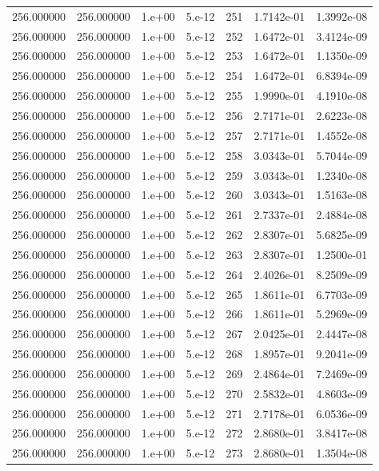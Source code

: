 \begin{table}[htbp]
\begin{tabular}{rrrrrrr}
256.000000 & 256.000000 & 1.e+00 & 5.e-12 & 251 & 1.7142e-01 & 1.3992e-08 \\
256.000000 & 256.000000 & 1.e+00 & 5.e-12 & 252 & 1.6472e-01 & 3.4124e-09 \\
256.000000 & 256.000000 & 1.e+00 & 5.e-12 & 253 & 1.6472e-01 & 1.1350e-09 \\
256.000000 & 256.000000 & 1.e+00 & 5.e-12 & 254 & 1.6472e-01 & 6.8394e-09 \\
256.000000 & 256.000000 & 1.e+00 & 5.e-12 & 255 & 1.9990e-01 & 4.1910e-08 \\
256.000000 & 256.000000 & 1.e+00 & 5.e-12 & 256 & 2.7171e-01 & 2.6223e-08 \\
256.000000 & 256.000000 & 1.e+00 & 5.e-12 & 257 & 2.7171e-01 & 1.4552e-08 \\
256.000000 & 256.000000 & 1.e+00 & 5.e-12 & 258 & 3.0343e-01 & 5.7044e-09 \\
256.000000 & 256.000000 & 1.e+00 & 5.e-12 & 259 & 3.0343e-01 & 1.2340e-08 \\
256.000000 & 256.000000 & 1.e+00 & 5.e-12 & 260 & 3.0343e-01 & 1.5163e-08 \\
256.000000 & 256.000000 & 1.e+00 & 5.e-12 & 261 & 2.7337e-01 & 2.4884e-08 \\
256.000000 & 256.000000 & 1.e+00 & 5.e-12 & 262 & 2.8307e-01 & 5.6825e-09 \\
256.000000 & 256.000000 & 1.e+00 & 5.e-12 & 263 & 2.8307e-01 & 1.2500e-01 \\
256.000000 & 256.000000 & 1.e+00 & 5.e-12 & 264 & 2.4026e-01 & 8.2509e-09 \\
256.000000 & 256.000000 & 1.e+00 & 5.e-12 & 265 & 1.8611e-01 & 6.7703e-09 \\
256.000000 & 256.000000 & 1.e+00 & 5.e-12 & 266 & 1.8611e-01 & 5.2969e-09 \\
256.000000 & 256.000000 & 1.e+00 & 5.e-12 & 267 & 2.0425e-01 & 2.4447e-08 \\
256.000000 & 256.000000 & 1.e+00 & 5.e-12 & 268 & 1.8957e-01 & 9.2041e-09 \\
256.000000 & 256.000000 & 1.e+00 & 5.e-12 & 269 & 2.4864e-01 & 7.2469e-09 \\
256.000000 & 256.000000 & 1.e+00 & 5.e-12 & 270 & 2.5832e-01 & 4.8603e-09 \\
256.000000 & 256.000000 & 1.e+00 & 5.e-12 & 271 & 2.7178e-01 & 6.0536e-09 \\
256.000000 & 256.000000 & 1.e+00 & 5.e-12 & 272 & 2.8680e-01 & 3.8417e-08 \\
256.000000 & 256.000000 & 1.e+00 & 5.e-12 & 273 & 2.8680e-01 & 1.3504e-08 \\

\end{tabular}
\end{table}
